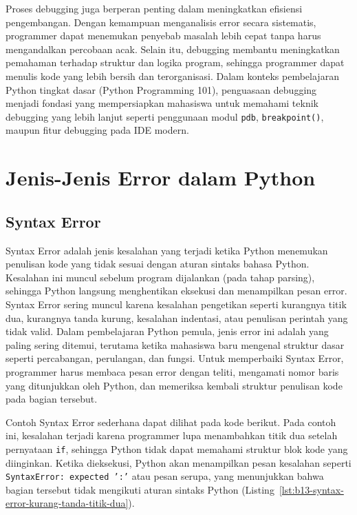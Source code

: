 Proses debugging juga berperan penting dalam meningkatkan efisiensi pengembangan. Dengan kemampuan menganalisis error secara sistematis, programmer dapat menemukan penyebab masalah lebih cepat tanpa harus mengandalkan percobaan acak. Selain itu, debugging membantu meningkatkan pemahaman terhadap struktur dan logika program, sehingga programmer dapat menulis kode yang lebih bersih dan terorganisasi. Dalam konteks pembelajaran Python tingkat dasar (Python Programming 101), penguasaan debugging menjadi fondasi yang mempersiapkan mahasiswa untuk memahami teknik debugging yang lebih lanjut seperti penggunaan modul \texttt{pdb}, \texttt{breakpoint()}, maupun fitur debugging pada IDE modern.


\section{Jenis-Jenis Error dalam Python}

\subsection{Syntax Error}

Syntax Error adalah jenis kesalahan yang terjadi ketika Python menemukan penulisan kode yang tidak sesuai dengan aturan sintaks bahasa Python. Kesalahan ini muncul sebelum program dijalankan (pada tahap parsing), sehingga Python langsung menghentikan eksekusi dan menampilkan pesan error. Syntax Error sering muncul karena kesalahan pengetikan seperti kurangnya titik dua, kurangnya tanda kurung, kesalahan indentasi, atau penulisan perintah yang tidak valid. Dalam pembelajaran Python pemula, jenis error ini adalah yang paling sering ditemui, terutama ketika mahasiswa baru mengenal struktur dasar seperti percabangan, perulangan, dan fungsi. Untuk memperbaiki Syntax Error, programmer harus membaca pesan error dengan teliti, mengamati nomor baris yang ditunjukkan oleh Python, dan memeriksa kembali struktur penulisan kode pada bagian tersebut.

Contoh Syntax Error sederhana dapat dilihat pada kode berikut. Pada contoh ini, kesalahan terjadi karena programmer lupa menambahkan titik dua setelah pernyataan \texttt{if}, sehingga Python tidak dapat memahami struktur blok kode yang diinginkan. Ketika dieksekusi, Python akan menampilkan pesan kesalahan seperti \texttt{SyntaxError: expected ':'} atau pesan serupa, yang menunjukkan bahwa bagian tersebut tidak mengikuti aturan sintaks Python (Listing~\ref{lst:b13-syntax-error-kurang-tanda-titik-dua}).

